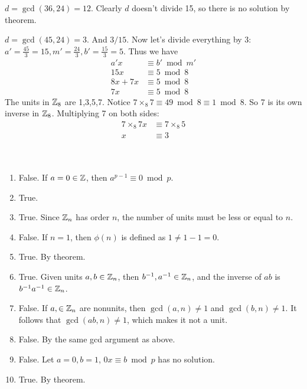 \documentclass[12pt]{article}
\begin{document}
\begin{problem}[20.13]
$ d=\gcd ( 36,24)=12 $. Clearly $ d$ doesn't divide 15, so there is no solution by theorem.
\end{problem}

\begin{problem}[20.14]
$ d= \gcd ( 45,24)=3 $. And $ 3 /15$. Now let's divide everything by 3:  $ a'=\frac{45}{3}=15, m'=\frac{24}{3}, b'=\frac{15}{3}=5$. Thus we have
\begin{align*}
	a'x &\equiv b' \bmod m'\\
	15 x &\equiv 5 \bmod 8\\
	8x+7x &\equiv 5 \bmod 8\\
	7x &\equiv 5 \bmod 8
\end{align*}
The units in $ \mathbb{Z}_8$ are 1,3,5,7. Notice $ 7 \times _8 7 \equiv 49 \bmod 8 \equiv 1 \bmod 8 $. So 7 is its own inverse in $ \mathbb{Z}_8$. Multiplying 7 on both sides:
\begin{align*}
	7 \times _8 7x &\equiv 7 \times _8 5\\
	x &\equiv 3\\
\end{align*}
\end{problem}

\begin{problem}[20.23]
	~\begin{enumerate}[label=\alph*)]
	\item False. If $ a=0 \in \mathbb{Z}$, then $ a^{p-1} \equiv 0 \bmod p$.
	\item True.
	\item True. Since $ \mathbb{Z}_n$ has order $ n$, the number of units must be less or equal to  $ n$.
	\item False. If  $ n=1$, then  $ \phi(n)$ is defined as $ 1 \neq 1-1=0$. 
	\item True. By theorem.
	\item True. Given units $ a,b \in \mathbb{Z}_n$, then $ b ^{-1}, a^{-1} \in \mathbb{Z}_n$, and the inverse of $ ab$ is  $ b ^{-1} a^{-1} \in \mathbb{Z}_n$.
	\item False. If $ a, \in \mathbb{Z}_n$ are nonunits, then $ \gcd ( a,n) \neq 1 $ and $ \gcd ( b,n) \neq 1 $. It follows that $ \gcd ( ab, n) \neq 1 $, which makes it not a unit.
	\item False. By the same gcd argument as above.
	\item False. Let $ a=0, b =1$,  $ 0x \equiv b \bmod p$ has no solution. 
	\item True. By theorem.
\end{enumerate}
\end{problem}
\end{document}
